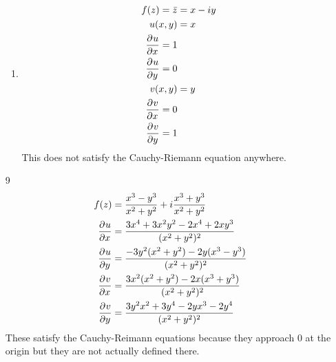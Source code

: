 \documentclass{article}
\begin{document}
\begin{enumerate}
\begin{enumerate}
        \item
          \begin{align*}
            f(z)=\bar{z}&=x-iy\\
            u(x,y)&=x\\
            \frac{\partial^{}u}{\partial x^{}}=1\\
            \frac{\partial^{}u}{\partial y^{}}=0\\
            v(x,y)&=y\\
            \frac{\partial^{}v}{\partial x^{}}=0\\
            \frac{\partial^{}v}{\partial y^{}}=1
          \end{align*}
          This does not satisfy the Cauchy-Riemann equation anywhere.
      \end{enumerate}
    \item[9]
      \begin{align*}
        f(z)&=\frac{x^3-y^3}{x^2+y^2}+i\frac{x^3+y^3}{x^2+y^2}\\
        \frac{\partial^{}u}{\partial x^{}}&=\frac{3x^4+3x^2y^2-2x^4+2xy^3}{(x^2+y^2)^2}\\
        \frac{\partial^{}u}{\partial y^{}}&=\frac{-3y^2(x^2+y^2)-2y(x^3-y^3)}{(x^2+y^2)^2}\\
        \frac{\partial^{}v}{\partial x^{}}&=\frac{3x^2(x^2+y^2)-2x(x^3+y^3)}{(x^2+y^2)^2}\\
        \frac{\partial^{}v}{\partial y^{}}&=\frac{3y^2x^2+3y^4-2yx^3-2y^4}{(x^2+y^2)^2}\\
      \end{align*}
      These satisfy the Cauchy-Reimann equations because they approach 0 at the origin but they are not actually defined there.
  \end{enumerate}
\end{document}
